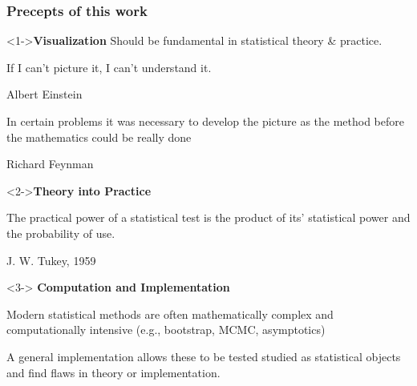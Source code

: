 \begin{frame}
  \frametitle{Precepts of this work}

  \begin{block}<1->{\textbf{Visualization}} Should be fundamental in statistical theory \&
	practice.
	\epigraph{If I can't picture it, I can't understand it.}{Albert Einstein}
	\epigraph{In certain problems it was necessary to  
	develop the \alert{picture as the method} before the mathematics 
	could be really done}{Richard Feynman}
	\end{block}

	\begin{block}<2->{\textbf{Theory into Practice}}
	\epigraph{The \alert{practical power} of a statistical test is the product
	of its' statistical power and the probability of use.}
	{J. W. Tukey, 1959\nocite{Tukey:59}}
	\end{block}

	
	\begin{block}<3->{ \textbf{Computation and Implementation}}
	 \begin{itemize*}
	  \item Modern statistical methods are often 
	  mathematically complex and 
	  computationally intensive (e.g., bootstrap, MCMC, asymptotics)
	  \item A general implementation allows these to be tested  \alert{studied as statistical
	  objects} and \alert{find flaws} in theory or implementation.
	\end{itemize*}
  \end{block}

\end{frame}
